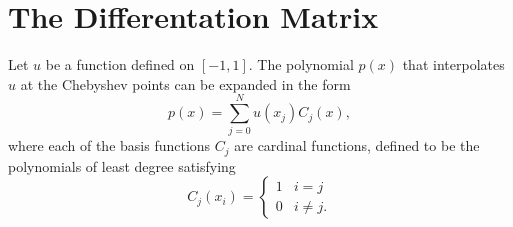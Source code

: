 \section{The Differentation Matrix}
Let $u$ be a function defined on $[-1,1]$.
The polynomial $p(x)$ that interpolates $u$ at the Chebyshev points can be expanded in the form 
\[p(x) = \sum_{j=0}^N u(x_j)C_j(x),\]
where each of the basis functions $C_j$ are cardinal functions, defined to be the polynomials of least degree satisfying
\begin{equation*}
C_j(x_i) = \begin{cases} 1 & i=j \\ 0 & i \not = j.
   \end{cases}
\end{equation*}

